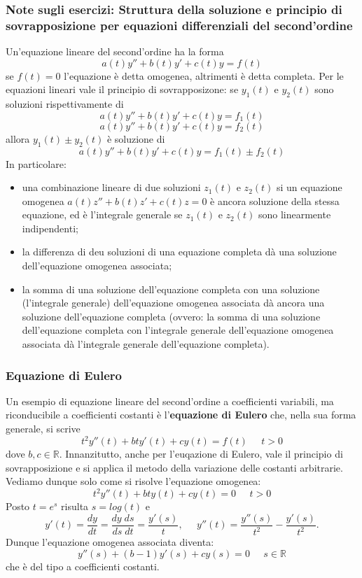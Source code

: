 \subsubsection{Note sugli esercizi: Struttura della soluzione e principio di sovrapposizione per equazioni differenziali del second'ordine}
Un'equazione lineare del second'ordine ha la forma
\[
    a(t) y'' + b(t) y' + c(t) y = f(t)
\]
se $f(t) = 0$ l'equazione è detta omogenea, altrimenti è detta completa. Per le equazioni lineari vale il principio di sovrapposizone: se $y_1(t)$ e $y_2(t)$ sono soluzioni rispettivamente di
\[
    a(t) y'' + b(t) y' + c(t) y = f_1(t)
\]
\[
    a(t) y'' + b(t) y' + c(t) y = f_2(t)
\]
allora $y_1(t) \pm y_2(t)$ è soluzione di 
\[
    a(t) y'' + b(t) y' + c(t) y = f_1(t)\pm f_2(t)
\]
In particolare:
\begin{itemize}
    \item una combinazione lineare di due soluzioni $z_1(t)$ e $z_2(t)$ si un equazione omogenea $a(t)z'' + b(t) z' + c(t) z = 0$ è ancora soluzione della stessa equazione, ed è l'integrale generale se $z_1(t)$ e $z_2(t)$ sono linearmente indipendenti;
    \item la differenza di deu soluzioni di una equazione completa dà una soluzione dell'equazione omogenea associata;
    \item la somma di una soluzione dell'equazione completa con una soluzione (l'integrale generale) dell'equazione omogenea associata dà ancora una soluzione dell'equazione completa (ovvero: la somma di una soluzione dell'equazione completa con l'integrale generale dell'equazione omogenea associata dà l'integrale generale dell'equazione completa).
\end{itemize}
\subsubsection{Equazione di Eulero}
Un esempio di equazione lineare del second'ordine a coefficienti variabili, ma riconducibile a coefficienti costanti è l'\textbf{equazione di Eulero} che, nella sua forma generale, si scrive
\[
    t^2y''(t) + bty'(t) + cy(t) = f(t) \;\;\;\;\;t>0
\]
dove $b,c \in \mathbb{R}$.\newline
Innanzitutto, anche per l'euqazione di Eulero, vale il principio di sovrapposizione e si applica il metodo della variazione delle costanti arbitrarie. Vediamo dunque solo come si risolve l'equazione omogenea:
\[
    t^2 y''(t) + bty(t) + cy(t) = 0 \;\;\;\;\;t>0
\]
Posto $t =  e^{s}$ risulta $s = log(t)$ e
\[
    y'(t) = \frac{dy}{dt} = \frac{dy\; ds}{ds\;dt} = \frac{y'(s)}{t}, \;\;\;\;\; y''(t) = \frac{y''(s)}{t^2} - \frac{y'(s)}{t^2}.
\]
Dunque l'equazione omogenea associata diventa:
\[
    y''(s) + (b-1)y'(s) + cy(s) = 0 \;\;\;\;\;s \in \mathbb{R}
\]
che è del tipo a coefficienti costanti.
